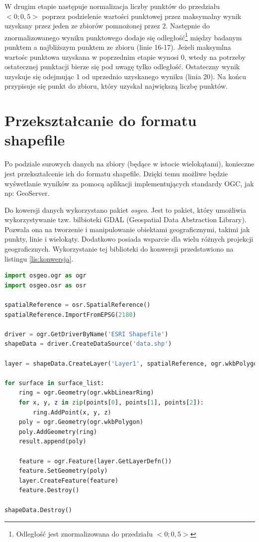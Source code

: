 W drugim etapie następuje normalizacja liczby punktów do przedziału $<0; 0,5>$ poprzez podzielenie wartości punktowej
przez maksymalny wynik uzyskany przez jeden ze zbiorów pomnożonej przez 2. Następnie do znormalizowanego wyniku punktowego
dodaje się odległość\footnote{Odległość jest znormalizowana do przedziału $<0; 0,5>$} 
między badanym punktem a najbliższym punktem ze zbioru (linie 16-17).
Jeżeli maksymlna wartośc punktowa uzyskana w poprzednim etapie wynosi 0, wtedy na potrzeby ostatecznej punktacji
bierze się pod uwagę tylko odległość. Ostateczny wynik uzyskuje się odejmując 1 od uprzednio uzyskanego wyniku (linia 20).
Na końcu przypisuje się punkt do zbioru, który uzyskał największą liczbę punktów.

\section{Przekształcanie do formatu shapefile}

Po podziale surowych danych na zbiory (będące w istocie wielokątami), konieczne jest
przekształcenie ich do formatu shapefile. Dzięki temu możliwe będzie wyśwetlanie wyników
za pomocą aplikacji implementujących standardy OGC, jak np: GeoServer.

Do kowersji danych wykorzystano pakiet \textit{osgeo}. Jest to pakiet, który umożliwia
wykorzystywanie tzw. bilbioteki GDAL (Geospatial Data Abstraction Library). Pozwala ona
na tworzenie i manipulowanie obiektami geograficznymi, takimi jak punkty, linie i wielokąty.
Dodatkowo posiada wsparcie dla wielu różnych projekcji geograficznych. Wykorzystanie tej
biblioteki do konwersji przedstawiono na listingu \ref{lis:konwersja}.

\begin{lstlisting}[frame=L, language=python, caption={Konwersja danych do formatu SHP}, label={lis:konwersja}]
import osgeo.ogr as ogr
import osgeo.osr as osr

spatialReference = osr.SpatialReference()
spatialReference.ImportFromEPSG(2180)

driver = ogr.GetDriverByName('ESRI Shapefile')
shapeData = driver.CreateDataSource('data.shp')

layer = shapeData.CreateLayer('Layer1', spatialReference, ogr.wkbPolygon)

for surface in surface_list:
	ring = ogr.Geometry(ogr.wkbLinearRing)
	for x, y, z in zip(points[0], points[1], points[2]):
	    ring.AddPoint(x, y, z)
	poly = ogr.Geometry(ogr.wkbPolygon)
	poly.AddGeometry(ring)
	result.append(poly)
	
	feature = ogr.Feature(layer.GetLayerDefn())
	feature.SetGeometry(poly)
	layer.CreateFeature(feature)
	feature.Destroy()

shapeData.Destroy()

\end{lstlisting}

